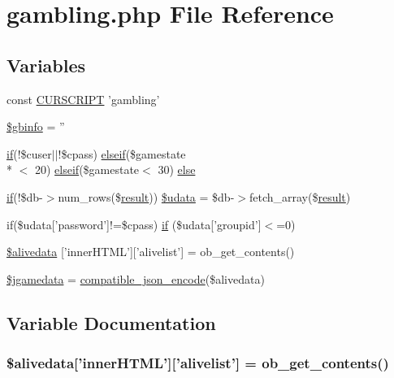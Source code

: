 \hypertarget{gambling_8php}{\section{gambling.\+php File Reference}
\label{gambling_8php}
}
\subsection*{Variables}
\begin{DoxyCompactItemize}
\item 
const \hyperlink{gambling_8php_a39c39f525eceb86cabc338804f230e80}{C\+U\+R\+S\+C\+R\+I\+P\+T} 'gambling'
\item 
\hyperlink{gambling_8php_aff66699e41c92bfb3392dcbac1092392}{\$gbinfo} = ''
\item 
\hyperlink{login__old_8php_a4ac1118c2e44c513a674bc1793ba6c90}{if}(!\$cuser$\vert$$\vert$!\$cpass) \hyperlink{urlist_8php_a77f52b43f81ed05a41b68c2161789055}{elseif}(\$gamestate\\*
$<$ 20) \hyperlink{urlist_8php_a77f52b43f81ed05a41b68c2161789055}{elseif}(\$gamestate$<$ 30) \hyperlink{gambling_8php_a7881d147b70c603cf3b0f3dce600efe0}{else}
\item 
\hyperlink{login__old_8php_a4ac1118c2e44c513a674bc1793ba6c90}{if}(!\$db-\/$>$num\+\_\+rows(\$\hyperlink{templates_2install_8php_abdecde238169a1e34f68354fc9968af0}{result})) \hyperlink{gambling_8php_aa64a6e7c321a5fc5c5089fc201f285cb}{\$udata} = \$db-\/$>$fetch\+\_\+array(\$\hyperlink{templates_2install_8php_abdecde238169a1e34f68354fc9968af0}{result})
\item 
if(\$udata\mbox{[}'password'\mbox{]}!=\$cpass) \hyperlink{gambling_8php_a2b37557b506ea2914ac1f29fa05dda34}{if} (\$udata\mbox{[}'groupid'\mbox{]}$<$=0)
\item 
\hyperlink{gambling_8php_ae1043fe0f5e02aac94dfcd694ceff113}{\$alivedata} \mbox{[}'inner\+H\+T\+M\+L'\mbox{]}\mbox{[}'alivelist'\mbox{]} = ob\+\_\+get\+\_\+contents()
\item 
\hyperlink{gambling_8php_ad8ad32ee4a34333c6c5c5b4379a80cf2}{\$jgamedata} = \hyperlink{global_8func_8php_a90ee856f9044b751e8c137763608fba4}{compatible\+\_\+json\+\_\+encode}(\$alivedata)
\end{DoxyCompactItemize}


\subsection{Variable Documentation}
\hypertarget{gambling_8php_ae1043fe0f5e02aac94dfcd694ceff113}{
\subsubsection[{\$alivedata}]{\setlength{\rightskip}{0pt plus 5cm}\$alivedata\mbox{[}'inner\+H\+T\+M\+L'\mbox{]}\mbox{[}'alivelist'\mbox{]} = ob\+\_\+get\+\_\+contents()}}\label{gambling_8php_ae1043fe0f5e02aac94dfcd694ceff113}


